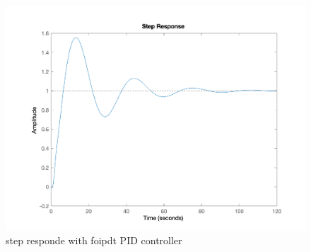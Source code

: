 \begin{figure}[H]
    \caption{step responde with foipdt PID controller}
    \centering
    \includegraphics[width=12cm]{../Figure/Q2/foipdt_PID.png}
\end{figure}
